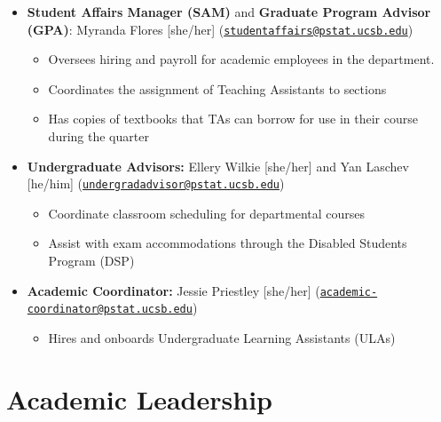 \documentclass[
  letterpaper,
  DIV=11,
  numbers=noendperiod]{scrreprt}
\providecommand{\tightlist}{%
  \setlength{\itemsep}{0pt}\setlength{\parskip}{0pt}}\usepackage{longtable,booktabs,array}
\begin{document}
\begin{itemize}
\tightlist
\item
  \textbf{Student Affairs Manager (SAM)} and \textbf{Graduate Program
  Advisor (GPA)}: Myranda Flores {[}she/her{]}
  (\href{mailto:studentaffairs@pstat.ucsb.edu}{\nolinkurl{studentaffairs@pstat.ucsb.edu}})

  \begin{itemize}
  \tightlist
  \item
    Oversees hiring and payroll for academic employees in the
    department.\\
  \item
    Coordinates the assignment of Teaching Assistants to sections
  \item
    Has copies of textbooks that TAs can borrow for use in their course
    during the quarter
  \end{itemize}
\item
  \textbf{Undergraduate Advisors:} Ellery Wilkie {[}she/her{]} and Yan
  Laschev {[}he/him{]}
  (\href{mailto:undergradadvisor@pstat.ucsb.edu}{\nolinkurl{undergradadvisor@pstat.ucsb.edu}})

  \begin{itemize}
  \tightlist
  \item
    Coordinate classroom scheduling for departmental courses
  \item
    Assist with exam accommodations through the Disabled Students
    Program (DSP)
  \end{itemize}
\item
  \textbf{Academic Coordinator:} Jessie Priestley {[}she/her{]}
  (\href{mailto:academic-coordinator@pstat.ucsb.edu}{\nolinkurl{academic-coordinator@pstat.ucsb.edu}})

  \begin{itemize}
  \tightlist
  \item
    Hires and onboards Undergraduate Learning Assistants (ULAs)
  \end{itemize}
\end{itemize}

\hypertarget{AcadLead}{%
\section*{Academic Leadership}\label{AcadLead}}

\end{document}
